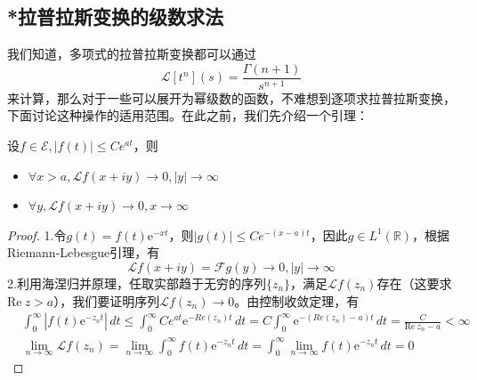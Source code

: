 \documentclass{ctexbook}
\begin{document}
\subsection{*拉普拉斯变换的级数求法}\label{sub:laplace_by_series}
我们知道，多项式的拉普拉斯变换都可以通过$$\mathcal{L} [t^n](s)=\dfrac{\Gamma(n+1)}{s^{n+1}}$$来计算，那么对于一些可以展开为幂级数的函数，不难想到逐项求拉普拉斯变换，下面讨论这种操作的适用范围。在此之前，我们先介绍一个引理：
\begin{lemma}
    设$f\in\mathcal{E} ,|f(t)|\leq Ce^{at}$，则\begin{itemize}
        \item $\forall x>a,\mathcal{L} f(x+iy)\to 0,|y|\to\infty$
        \item $\forall y,\mathcal{L} f(x+iy)\to 0,x\to\infty$
    \end{itemize}
\end{lemma}
\begin{proof}
    1.令$g(t)=f(t)\mathrm{e}^{-x t}$，则$|g(t)|\leq Ce^{-(x-a)t}$，因此$g\in L^1(\mathbb{R} )$，根据Riemann-Lebesgue引理，有
    \[\mathcal{L} f(x+iy)=\mathcal{F} g(y)\to 0,|y|\to\infty\]
    2.利用海涅归并原理，任取实部趋于无穷的序列$\{z_n\}$，满足$\mathcal{L} f(z_n)$存在（这要求$\text{Re}\ z>a$），我们要证明序列$\mathcal{L} f(z_n)\to 0$。由控制收敛定理，有
    \begin{align*}
        &\int_{0}^{\infty}|f(t)\mathrm{e}^{-z_n t}|\,dt\leq \int_0^{\infty}Ce^{at}\mathrm{e}^{-Re(z_n) t}\,dt=C\int_0^{\infty}\mathrm{e}^{-(Re(z_n)-a)t}\,dt=\frac{C}{\text{Re}\ z_n-a}<\infty\\
        &\lim_{n\to\infty}\mathcal{L} f(z_n)=\lim_{n\to\infty}\int_0^{\infty}f(t)\mathrm{e}^{-z_n t}\,dt=\int_0^{\infty}\lim_{n\to\infty}f(t)\mathrm{e}^{-z_n t}\,dt=0
    \end{align*}
\end{proof}
\end{document}
